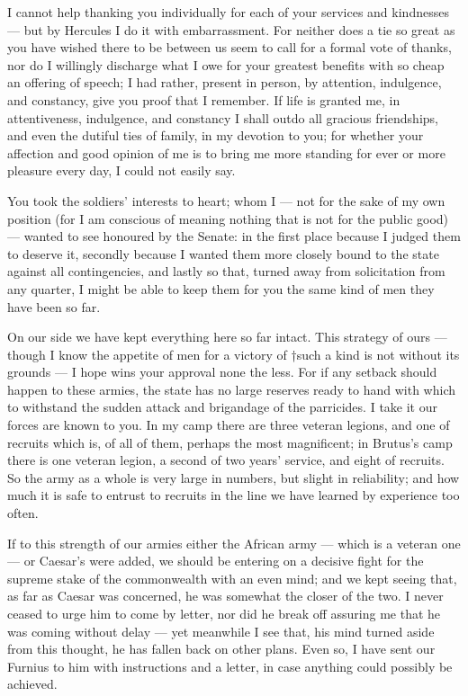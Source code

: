 

 I cannot help thanking you individually for each of your services and kindnesses --- but by Hercules I do it with embarrassment. For neither does a tie so great as you have wished there to be between us seem to call for a formal vote of thanks, nor do I willingly discharge what I owe for your greatest benefits with so cheap an offering of speech; I had rather, present in person, by attention, indulgence, and constancy, give you proof that I remember. If life is granted me, in attentiveness, indulgence, and constancy I shall outdo all gracious friendships, and even the dutiful ties of family, in my devotion to you; for whether your affection and good opinion of me is to bring me more standing for ever or more pleasure every day, I could not easily say.

 You took the soldiers' interests to heart; whom I --- not for the sake of my own position (for I am conscious of meaning nothing that is not for the public good) --- wanted to see honoured by the Senate: in the first place because I judged them to deserve it, secondly because I wanted them more closely bound to the state against all contingencies, and lastly so that, turned away from solicitation from any quarter, I might be able to keep them for you the same kind of men they have been so far.

 On our side we have kept everything here so far intact. This strategy of ours --- though I know the appetite of men for a victory of †such a kind is not without its grounds --- I hope wins your approval none the less. For if any setback should happen to these armies, the state has no large reserves ready to hand with which to withstand the sudden attack and brigandage of the parricides. I take it our forces are known to you. In my camp there are three veteran legions, and one of recruits which is, of all of them, perhaps the most magnificent; in Brutus's camp there is one veteran legion, a second of two years' service, and eight of recruits. So the army as a whole is very large in numbers, but slight in reliability; and how much it is safe to entrust to recruits in the line we have learned by experience too often.

 If to this strength of our armies either the African army --- which is a veteran one --- or Caesar's were added, we should be entering on a decisive fight for the supreme stake of the commonwealth with an even mind; and we kept seeing that, as far as Caesar was concerned, he was somewhat the closer of the two. I never ceased to urge him to come by letter, nor did he break off assuring me that he was coming without delay --- yet meanwhile I see that, his mind turned aside from this thought, he has fallen back on other plans. Even so, I have sent our Furnius to him with instructions and a letter, in case anything could possibly be achieved.

